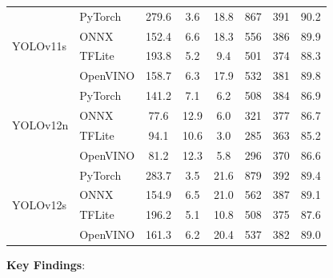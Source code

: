 \begin{table}[!t]
{\begin{tabular}{llcccccc}
\midrule
\multirow{4}{*}{YOLOv11s} & PyTorch & 279.6 & 3.6 & 18.8 & 867 & 391 & 90.2 \\
 & ONNX & 152.4 & 6.6 & 18.3 & 556 & 386 & 89.9 \\
 & TFLite & 193.8 & 5.2 & 9.4 & 501 & 374 & 88.3 \\
 & OpenVINO & 158.7 & 6.3 & 17.9 & 532 & 381 & 89.8 \\
\midrule
\multirow{4}{*}{YOLOv12n} & PyTorch & 141.2 & 7.1 & 6.2 & 508 & 384 & 86.9 \\
 & ONNX & 77.6 & 12.9 & 6.0 & 321 & 377 & 86.7 \\
 & TFLite & 94.1 & 10.6 & 3.0 & 285 & 363 & 85.2 \\
 & OpenVINO & 81.2 & 12.3 & 5.8 & 296 & 370 & 86.6 \\
\midrule
\multirow{4}{*}{YOLOv12s} & PyTorch & 283.7 & 3.5 & 21.6 & 879 & 392 & 89.4 \\
 & ONNX & 154.9 & 6.5 & 21.0 & 562 & 387 & 89.1 \\
 & TFLite & 196.2 & 5.1 & 10.8 & 508 & 375 & 87.6 \\
 & OpenVINO & 161.3 & 6.2 & 20.4 & 537 & 382 & 89.0 \\
\bottomrule
\end{tabular}
}
\end{table}

\textbf{Key Findings}:

